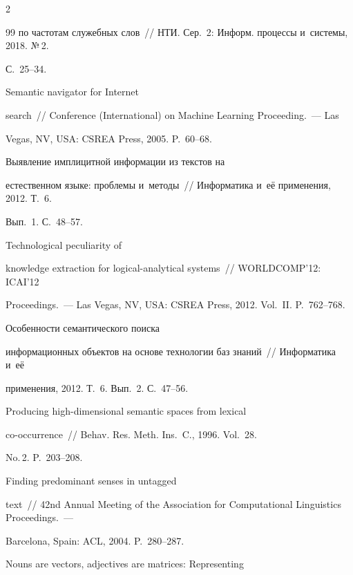 \begin{multicols}{2}
{{\begin{thebibliography}{99}
по частотам служебных слов~// НТИ. Сер.~2: Информ. процессы и~системы, 2018. №\,2. 


С.~25--34.




 Semantic navigator for Internet 


search~// Conference (International) on Machine Learning Proceeding.~--- Las 


Vegas, NV, USA: CSREA Press, 2005. P.~60--68.




 Выявление имплицитной информации из текстов на 


естественном языке: проб\-ле\-мы и~методы~// Информатика и~её применения, 2012. Т.~6. 


Вып.~1. С.~48--57.




 Technological peculiarity of 


knowledge extraction for logical-analytical systems~// WORLDCOMP'12: ICAI'12 


Proceedings.~--- Las Vegas, NV, USA: CSREA Press, 2012. Vol.~II. P.~762--768.




 Особенности семантического поиска 


информационных объектов на основе технологии баз знаний~// Информатика и~её 


применения, 2012. Т.~6. Вып.~2. С.~47--56.




 Producing high-dimensional semantic spaces from lexical  


co-occurrence~// Behav. Res. Meth. Ins.~C., 1996. Vol.~28. 


No.\,2. P.~203--208.




 Finding predominant senses in untagged 


text~// 42nd Annual Meeting of the Association for Computational Linguistics Proceedings.~--- 


Barcelona, Spain: ACL, 2004. P.~280--287.




 Nouns are vectors, adjectives are matrices: Representing 



\end{thebibliography}}}
\end{multicols}
